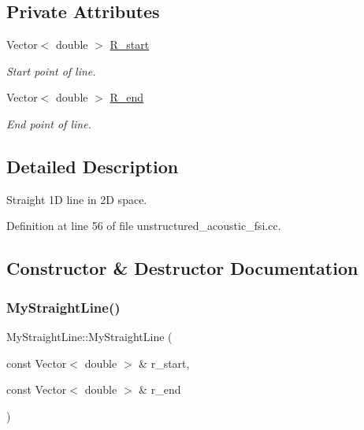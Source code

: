 \subsection*{Private Attributes}
\begin{DoxyCompactItemize}
\item 
Vector$<$ double $>$ \hyperlink{classMyStraightLine_a0f66636dd5d1e7ff6ec93acf90879f0c}{R\+\_\+start}
\begin{DoxyCompactList}\small\item\em Start point of line. \end{DoxyCompactList}\item 
Vector$<$ double $>$ \hyperlink{classMyStraightLine_afa466e12301ccea99a02fe1bde615691}{R\+\_\+end}
\begin{DoxyCompactList}\small\item\em End point of line. \end{DoxyCompactList}\end{DoxyCompactItemize}


\subsection{Detailed Description}
Straight 1D line in 2D space. 

Definition at line 56 of file unstructured\+\_\+acoustic\+\_\+fsi.\+cc.



\subsection{Constructor \& Destructor Documentation}
\mbox{\label{classMyStraightLine_a2c63e574f21703250a31fc446ab8045d}} 
\subsubsection{\texorpdfstring{My\+Straight\+Line()}{MyStraightLine()}\hspace{0.1cm}{\footnotesize\ttfamily [1/2]}}
{\footnotesize\ttfamily My\+Straight\+Line\+::\+My\+Straight\+Line (\begin{DoxyParamCaption}\item[{const Vector$<$ double $>$ \&}]{r\+\_\+start,  }\item[{const Vector$<$ double $>$ \&}]{r\+\_\+end }\end{DoxyParamCaption})\hspace{0.3cm}{\ttfamily [inline]}}



